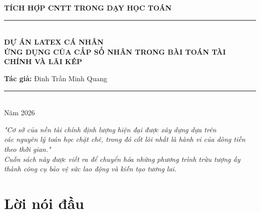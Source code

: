 \documentclass[14pt, a4paper, oneside]{extreport}
\begin{document}
\begin{titlepage}
    \centering
    \vspace*{2cm}
    
    {\Large \textbf{TÍCH HỢP CNTT TRONG DẠY HỌC TOÁN}}\\[0.5cm]
    \rule{\textwidth}{1pt}\\[2cm]
    
    {\Huge \textbf{DỰ ÁN LATEX CÁ NHÂN}}\\[1cm]
    {\LARGE \textbf{ỨNG DỤNG CỦA CẤP SỐ NHÂN TRONG BÀI TOÁN TÀI CHÍNH VÀ LÃI KÉP}}\\[1.5cm]
    
    \begin{tcolorbox}[colback=blue!5!white, colframe=blue!75!black, 
                      width=0.7\textwidth, arc=2mm, auto outer arc, center]
        \centering
        \vspace{0.3cm}
        \textbf{Tác giả:} Đinh Trần Minh Quang\\
        \vspace{0.3cm}
    \end{tcolorbox}
    
    \vfill
    \rule{\textwidth}{0.4pt}\\[0.5cm]
    {\large Năm 2026}
\end{titlepage}

\newpage
\thispagestyle{empty}
\vspace*{7cm}
\begin{flushright}
    \textit{"Cơ sở của nền tài chính định lượng hiện đại được xây dựng dựa trên \\
    các nguyên lý toán học chặt chẽ, trong đó cốt lõi nhất là hành vi của dòng tiền theo thời gian."}\\[1cm]
    \textit{Cuốn sách này được viết ra để chuyển hóa những phương trình trừu tượng ấy \\
    thành công cụ bảo vệ sức lao động và kiến tạo tương lai.}
\end{flushright}
\newpage

\chapter*{Lời nói đầu}
\end{document}
